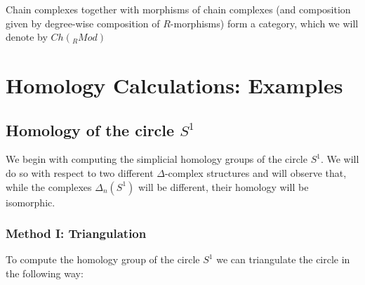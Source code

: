 \documentclass[11pt,a4paper]{report}
\begin{document}

        Chain complexes together with morphisms of chain complexes (and composition given by
        degree-wise composition of $R$-morphisms) form a category, which we will denote by $Ch(_RMod)$

		 \section{Homology Calculations: Examples}\label{homology_ex}

		 \subsection{Homology of the circle $ S^1$}
		 We begin with computing the simplicial homology groups of the circle $S^1$. We will do so with respect to two different
                $\Delta$-complex structures and will observe that, while the complexes $\Delta_n(S^1)$ will be different, their homology will be isomorphic.
                
                \subsubsection{Method I: Triangulation}
                To compute the homology group of the circle $S^1$ we can triangulate the circle in the following way: \\
\end{document}
